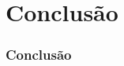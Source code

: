\section{Conclusão}
\label{sec:conclusion}

\contentscurrent

\begin{frame}
\frametitle{Conclusão}
\end{frame}